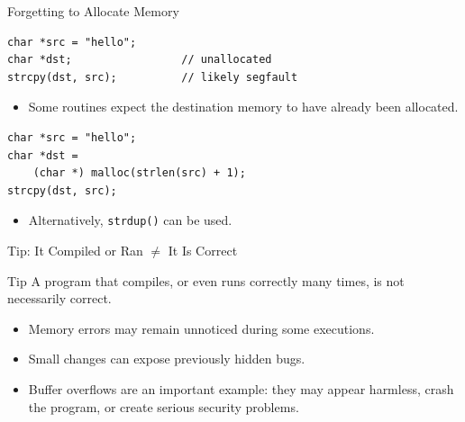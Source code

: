 \begin{frame}[fragile]{Forgetting to Allocate Memory}
\begin{verbatim}
char *src = "hello";
char *dst;                 // unallocated
strcpy(dst, src);          // likely segfault
\end{verbatim}

    \begin{itemize}
        \item Some routines expect the destination memory to have
              already been allocated.
    \end{itemize}

\begin{verbatim}
char *src = "hello";
char *dst =
    (char *) malloc(strlen(src) + 1);
strcpy(dst, src);
\end{verbatim}

    \begin{itemize}
        \item Alternatively, \texttt{strdup()} can be used.
    \end{itemize}
\end{frame}


\begin{frame}{Tip: It Compiled or Ran $\neq$ It Is Correct}
    \begin{block}{Tip}
        A program that compiles, or even runs correctly many times,
        is not necessarily correct.
    \end{block}

    \begin{itemize}
        \item Memory errors may remain unnoticed during some executions.
        \item Small changes can expose previously hidden bugs.
        \item Buffer overflows are an important example:
              they may appear harmless, crash the program,
              or create serious security problems.
    \end{itemize}
\end{frame}


